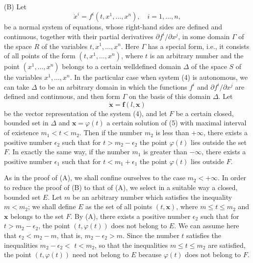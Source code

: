\documentclass[10pt,a5paper]{book}
\theoremstyle{plain}
\theoremstyle{definition}
\theoremstyle{remark}
\begin{document}
(B) Let
\begin{equation*}
\dot{x}^{i}=f^{i}\left(t, x^{1}, \ldots, x^{n}\right), \quad i=1, \ldots, n, \tag{4}
\end{equation*}
be a normal system of equations, whose right-hand sides are defined and continuous, together with their partial derivatives $\partial f^{i} / \partial x^{j}$, in some domain $\Gamma$ of the space $R$ of the variables $t, x^{1}, \ldots, x^{n}$. Here $\Gamma$ has a special form, i.e., it consists of all points of the form $\left(t, x^{1}, \ldots, x^{n}\right)$, where $t$ is an arbitrary number and the point $\left(x^{1}, \ldots, x^{n}\right)$ belongs to a certain welldefined domain $\Delta$ of the space $S$ of the variables $x^{1}, \ldots, x^{n}$. In the particular case when system (4) is autonomous, we can take $\Delta$ to be an arbitrary domain in which the functions $f^{i}$ and $\partial f^{i} / \partial x^{j}$ are defined and continuous, and then form $\Gamma$ on the basis of this domain $\Delta$. Let
\begin{equation*}
\dot{\mathbf{x}}=\mathbf{f}(l, \mathbf{x}) \tag{5}
\end{equation*}
be the vector representation of the system (4), and let $F$ be a certain closed, bounded set in $\Delta$ and $\mathbf{x}=\varphi(t)$ a certain solution of (5) with maximal interval of existence $m_{1}<t<m_{2}$. Then if the number $m_{2}$ is less than $+\infty$, there exists a positive number $\epsilon_{2}$ such that for $t>m_{2}-\epsilon_{2}$ the point $\varphi(t)$ lies outside the set $F$. In exactly the same way, if the number $m_{1}$ is greater than $-\infty$, there exists a positive number $\epsilon_{1}$ such that for $t<m_{1}+\epsilon_{1}$ the point $\varphi(t)$ lies outside $F$.

As in the proof of (A), we shall confine ourselves to the case $m_{2}<+\infty$. In order to reduce the proof of (B) to that of (A), we select in a suitable way a closed, bounded set $E$. Let $m$ be an arbitrary number which satisfies the inequality $m<m_{2}$; we shall define $E$ as the set of all points $(t, \mathbf{x})$, where $m \leq t \leq m_{2}$ and $\mathbf{x}$ belongs to the set $F$. By (A), there exists a positive number $\epsilon_{2}$ such that for $t>m_{2}-\epsilon_{2}$, the point $(t, \varphi(t))$ does not belong to $E$. We can assume here that $\epsilon_{2}<m_{2}-m$, that is, $m_{2}-\epsilon_{2}>m$. Since the number $t$ satisfies the inequalities $m_{2}-\epsilon_{2}<$ $t<m_{2}$, so that the inequalities $m \leq t \leq m_{2}$ are satisfied, the point $(t, \varphi(t))$ need not belong to $E$ because $\varphi(t)$ does not belong to $F$.
\end{document}
